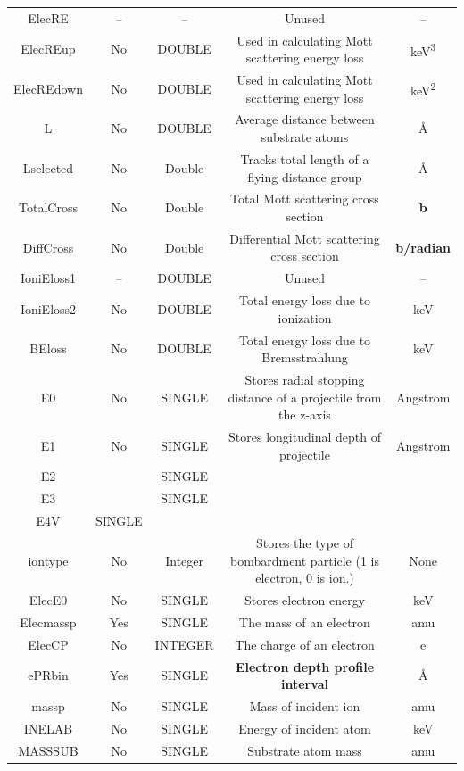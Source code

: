 \documentclass[10pt, reqno]{exam}
\begin{document}
{\begin{longtable}{|c|c|c|c|c|}
        ElecRE  & -- & --  & Unused  & --  \\
        ElecREup    & No  & DOUBLE  & Used in calculating Mott scattering energy loss  & \si{keV^3}  \\
        ElecREdown  &  No & DOUBLE  &  Used in calculating Mott scattering energy loss & \si{keV^2}  \\
        L   &  No & DOUBLE  & Average distance between substrate atoms  & \si{\angstrom}  \\
        Lselected   & No  &  Double & Tracks total length of a flying distance group  & \si{\angstrom}  \\
        TotalCross  & No  &  Double & Total Mott scattering cross section &  \textbf{b} \\
        DiffCross  & No & Double & Differential Mott scattering cross section &  \textbf{b/radian} \\
        IoniEloss1  &  -- & DOUBLE  &  Unused & --  \\
        IoniEloss2  & No  &  DOUBLE & Total energy loss due to ionization & keV  \\
        BEloss  & No  & DOUBLE  & Total energy loss due to Bremsstrahlung  & keV  \\
        E0  & No & SINGLE  & Stores radial stopping distance of a projectile from the z-axis & Angstrom \\
        E1  & No  & SINGLE  & Stores longitudinal depth of projectile & Angstrom  \\
        E2  &   & SINGLE  &   &   \\
        E3  &   & SINGLE  &   &   \\
        E4V     & SINGLE  &   &   &   \\
        \hline
        iontype & No & Integer & Stores the type of bombardment particle (1 is electron, 0 is ion.) & None \\
        ElecE0 & No & SINGLE & Stores electron energy & keV \\
        Elecmassp & Yes & SINGLE & The mass of an electron & amu \\
        ElecCP & No & INTEGER & The charge of an electron & e \\
        ePRbin & Yes & SINGLE & \textbf{Electron depth profile interval} & \si{\angstrom} \\
        massp & No & SINGLE & Mass of incident ion & amu \\
        INELAB & No & SINGLE & Energy of incident atom & keV \\
        MASSSUB & No & SINGLE & Substrate atom mass & amu \\

\end{longtable}}
\end{document}
